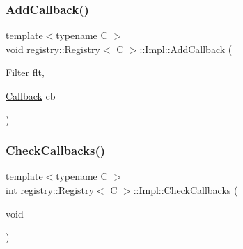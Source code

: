 \subsubsection{\texorpdfstring{Add\+Callback()}{AddCallback()}}
{\footnotesize\ttfamily template$<$typename C $>$ \\
void \hyperlink{classregistry_1_1Registry}{registry\+::\+Registry}$<$ C $>$\+::Impl\+::\+Add\+Callback (\begin{DoxyParamCaption}\item[{\hyperlink{classregistry_1_1Filter}{Filter}}]{flt,  }\item[{\hyperlink{classregistry_1_1AbstractRegistry_a08a798ca9ca1c4c983ebd2386ca3c315}{Callback}}]{cb }\end{DoxyParamCaption})\hspace{0.3cm}{\ttfamily [inline]}}

\mbox{\label{classregistry_1_1Registry_1_1Impl_ad4c82e293645478de0d0ad5e1dba9fed}} 
\subsubsection{\texorpdfstring{Check\+Callbacks()}{CheckCallbacks()}\hspace{0.1cm}{\footnotesize\ttfamily [1/3]}}
{\footnotesize\ttfamily template$<$typename C $>$ \\
int \hyperlink{classregistry_1_1Registry}{registry\+::\+Registry}$<$ C $>$\+::Impl\+::\+Check\+Callbacks (\begin{DoxyParamCaption}\item[{void}]{ }\end{DoxyParamCaption})\hspace{0.3cm}{\ttfamily [private]}}

\mbox{\label{classregistry_1_1Registry_1_1Impl_a438306d63584a3668372c33bffb0ce28}} 
